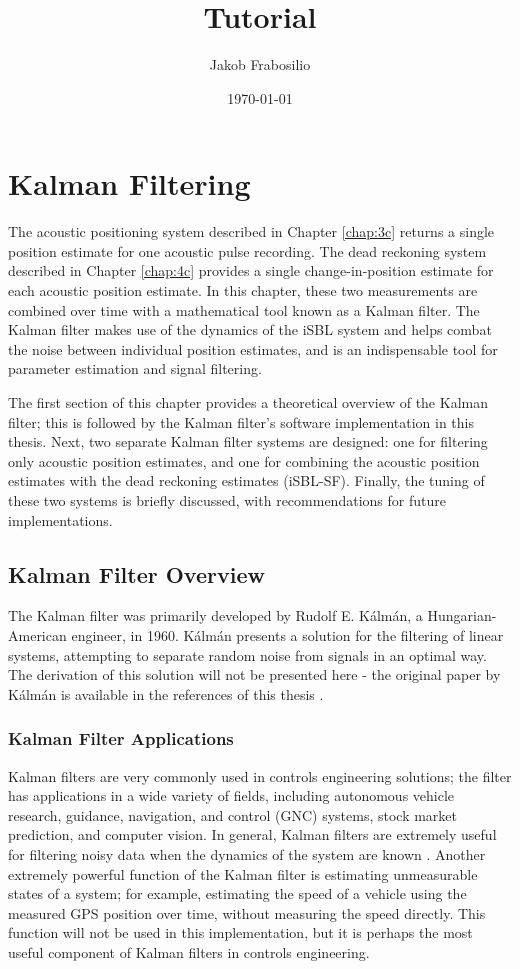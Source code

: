 \documentclass[12pt,a4paper]{report}
\title{Tutorial}
\author{Jakob Frabosilio}
\date{\today}
\begin{document}
\chapter{Kalman Filtering} \label{chap:5c}
The acoustic positioning system described in Chapter \ref{chap:3c} returns a single position estimate for one acoustic pulse recording. The dead reckoning system described in Chapter \ref{chap:4c} provides a single change-in-position estimate for each acoustic position estimate. In this chapter, these two measurements are combined over time with a mathematical tool known as a Kalman filter. The Kalman filter makes use of the dynamics of the iSBL system and helps combat the noise between individual position estimates, and is an indispensable tool for parameter estimation and signal filtering.

The first section of this chapter provides a theoretical overview of the Kalman filter; this is followed by the Kalman filter’s software implementation in this thesis. Next, two separate Kalman filter systems are designed: one for filtering only acoustic position estimates, and one for combining the acoustic position estimates with the dead reckoning estimates (iSBL-SF). Finally, the tuning of these two systems is briefly discussed, with recommendations for future implementations.

\section{Kalman Filter Overview} \label{sec:5s1}
The Kalman filter was primarily developed by Rudolf E. Kálmán, a Hungarian-American engineer, in 1960. Kálmán presents a solution for the filtering of linear systems, attempting to separate random noise from signals in an optimal way. The derivation of this solution will not be presented here - the original paper by Kálmán is available in the references of this thesis \cite{kalman}.

\subsection{Kalman Filter Applications} \label{ssec:5s1s1}
Kalman filters are very commonly used in controls engineering solutions; the filter has applications in a wide variety of fields, including autonomous vehicle research, guidance, navigation, and control (GNC) systems, stock market prediction, and computer vision. In general, Kalman filters are extremely useful for filtering noisy data when the dynamics of the system are known \cite{kalmanapps}. Another extremely powerful function of the Kalman filter is estimating unmeasurable states of a system; for example, estimating the speed of a vehicle using the measured GPS position over time, without measuring the speed directly. This function will not be used in this implementation, but it is perhaps the most useful component of Kalman filters in controls engineering.
\end{document}
